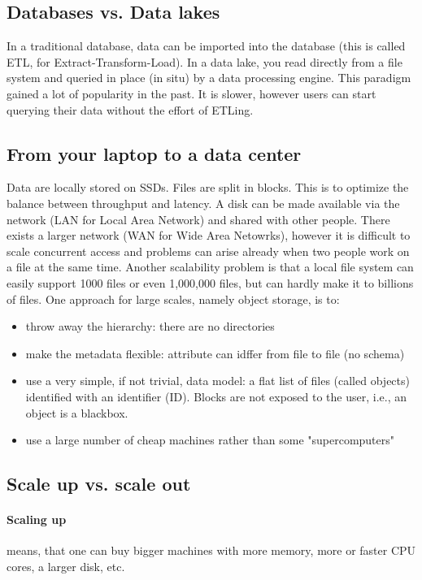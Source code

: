 \subsection{Databases vs. Data lakes}

In a traditional database, data can be imported into the database (this is called ETL, for Extract-Transform-Load).
In a data lake, you read directly from a file system and queried in place (in situ) by a data processing engine. This paradigm gained a lot of popularity in the past. It is slower, however users can start querying their data without the effort of ETLing.


\subsection{From your laptop to a data center}

Data are locally stored on SSDs. Files are split in blocks. This is to optimize the balance between throughput and latency.
A disk can be made available via the network (LAN for Local Area Network) and shared with other people. There exists a larger network (WAN for Wide Area Netowrks), however it is difficult to scale concurrent access and problems can arise already when two people work on a file at the same time.
Another scalability problem is that a local file system can easily support 1000 files or even 1,000,000 files, but can hardly make it to billions of files.
One approach for large scales, namely object storage, is to:
\begin{itemize}
    \item throw away the hierarchy: there are no directories
    \item make the metadata flexible: attribute can idffer from file to file (no schema)
    \item use a very simple, if not trivial, data model: a flat list of files (called objects) identified with an identifier (ID). Blocks are not exposed to the user, i.e., an object is a blackbox.
    \item use a large number of cheap machines rather than some "supercomputers"
\end{itemize}

\subsection{Scale up vs. scale out}

\paragraph{Scaling up} means, that one can buy bigger machines with more memory, more or faster CPU cores, a larger disk, etc.

